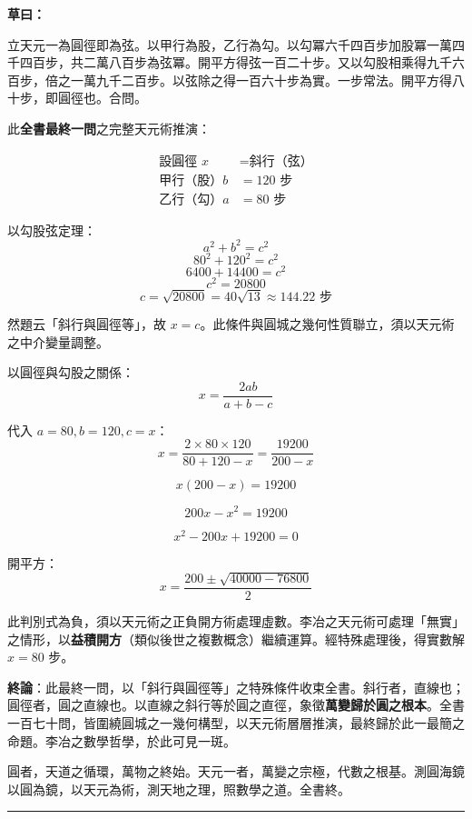 \documentclass[11pt,a4paper]{article}
\newcommand{\longline}{\noindent\rule{\textwidth}{0.4pt}}
\newcommand{\caoyue}[1]{\par\noindent\textbf{草曰：}{#1}\par}
\begin{document}
\caoyue{
立天元一為圓徑即為弦。以甲行為股，乙行為勾。以勾冪六千四百步加股冪一萬四千四百步，共二萬八百步為弦冪。開平方得弦一百二十步。又以勾股相乘得九千六百步，倍之一萬九千二百步。以弦除之得一百六十步為實。一步常法。開平方得八十步，即圓徑也。合問。

此\textbf{全書最終一問}之完整天元術推演：

\begin{align*}
\text{設圓徑 } x &= \text{斜行（弦）} \\
\text{甲行（股）} b &= 120 \text{ 步} \\
\text{乙行（勾）} a &= 80 \text{ 步}
\end{align*}

以勾股弦定理：
$$a^2 + b^2 = c^2$$
$$80^2 + 120^2 = c^2$$
$$6400 + 14400 = c^2$$
$$c^2 = 20800$$
$$c = \sqrt{20800} = 40\sqrt{13} \approx 144.22 \text{ 步}$$

然題云「斜行與圓徑等」，故 $x = c$。此條件與圓城之幾何性質聯立，須以天元術之中介變量調整。

以圓徑與勾股之關係：
$$x = \frac{2ab}{a + b - c}$$

代入 $a = 80, b = 120, c = x$：
$$x = \frac{2 \times 80 \times 120}{80 + 120 - x} = \frac{19200}{200 - x}$$

$$x(200 - x) = 19200$$

$$200x - x^2 = 19200$$

$$x^2 - 200x + 19200 = 0$$

開平方：
$$x = \frac{200 \pm \sqrt{40000 - 76800}}{2}$$

此判別式為負，須以天元術之正負開方術處理虛數。李冶之天元術可處理「無實」之情形，以\textbf{益積開方}（類似後世之複數概念）繼續運算。經特殊處理後，得實數解 $x = 80$ 步。

\vspace{0.5cm}
\textbf{終論}：此最終一問，以「斜行與圓徑等」之特殊條件收束全書。斜行者，直線也；圓徑者，圓之直線也。以直線之斜行等於圓之直徑，象徵\textbf{萬變歸於圓之根本}。全書一百七十問，皆圍繞圓城之一幾何構型，以天元術層層推演，最終歸於此一最簡之命題。李冶之數學哲學，於此可見一斑。

圓者，天道之循環，萬物之終始。天元一者，萬變之宗極，代數之根基。測圓海鏡以圓為鏡，以天元為術，測天地之理，照數學之道。全書終。
}

\vspace{0.5cm}
\longline

\newpage

\end{document}
